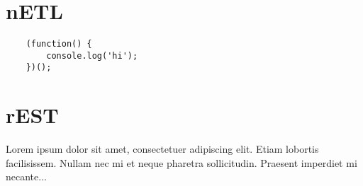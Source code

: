 \documentclass{article}
\begin{document}
\section{nETL}


\begin{verbatim}
    (function() {
        console.log('hi');
    })();
\end{verbatim}





\section{rEST}

Lorem ipsum dolor sit amet, consectetuer adipiscing elit.
Etiam lobortis facilisissem.  Nullam nec mi et neque pharetra
sollicitudin.  Praesent imperdiet mi necante...
\end{document}
